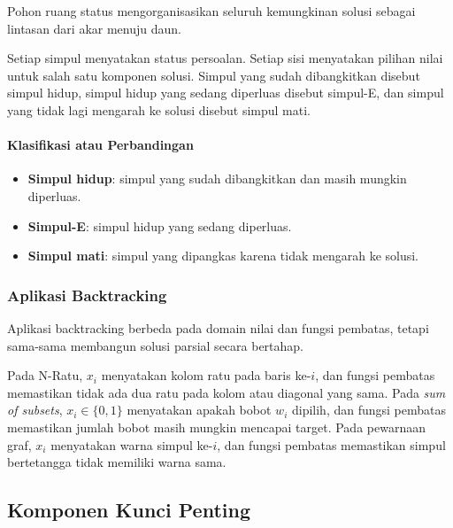 \begin{jawab}
Pohon ruang status mengorganisasikan seluruh kemungkinan solusi sebagai lintasan dari akar menuju daun.
\end{jawab}

Setiap simpul menyatakan status persoalan. Setiap sisi menyatakan pilihan nilai untuk salah satu komponen solusi. Simpul yang sudah dibangkitkan disebut simpul hidup, simpul hidup yang sedang diperluas disebut simpul-E, dan simpul yang tidak lagi mengarah ke solusi disebut simpul mati.

\paragraph{Klasifikasi atau Perbandingan}
\begin{itemize}
    \item \textbf{Simpul hidup}: simpul yang sudah dibangkitkan dan masih mungkin diperluas.
    \item \textbf{Simpul-E}: simpul hidup yang sedang diperluas.
    \item \textbf{Simpul mati}: simpul yang dipangkas karena tidak mengarah ke solusi.
\end{itemize}

\subsubsection{Aplikasi Backtracking}

\begin{jawab}
Aplikasi backtracking berbeda pada domain nilai dan fungsi pembatas, tetapi sama-sama membangun solusi parsial secara bertahap.
\end{jawab}

Pada N-Ratu, $x_i$ menyatakan kolom ratu pada baris ke-$i$, dan fungsi pembatas memastikan tidak ada dua ratu pada kolom atau diagonal yang sama. Pada \textit{sum of subsets}, $x_i \in \{0,1\}$ menyatakan apakah bobot $w_i$ dipilih, dan fungsi pembatas memastikan jumlah bobot masih mungkin mencapai target. Pada pewarnaan graf, $x_i$ menyatakan warna simpul ke-$i$, dan fungsi pembatas memastikan simpul bertetangga tidak memiliki warna sama.

\subsection{Komponen Kunci Penting}

